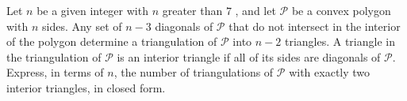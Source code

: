 Let $n$ be a given integer with $n$ greater than $7$ , and let $\mathcal{P}$ be a convex polygon with $n$ sides. Any set of $n-3$ diagonals of $\mathcal{P}$ that do not intersect in the interior of the polygon determine a triangulation of $\mathcal{P}$ into $n-2$ triangles. A triangle in the triangulation of $\mathcal{P}$ is an interior triangle if all of its sides are diagonals of $\mathcal{P}$. Express, in terms of $n$, the number of triangulations of $\mathcal{P}$ with exactly two interior triangles, in closed form.